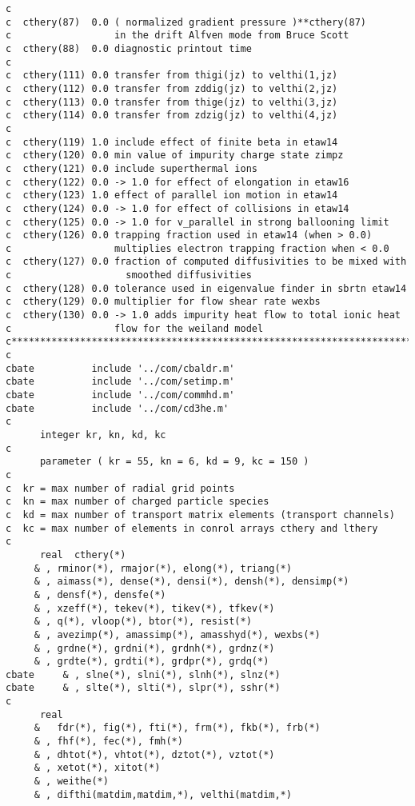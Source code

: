 \begin{verbatim}
c
c  cthery(87)  0.0 ( normalized gradient pressure )**cthery(87)
c                  in the drift Alfven mode from Bruce Scott
c  cthery(88)  0.0 diagnostic printout time
c
c  cthery(111) 0.0 transfer from thigi(jz) to velthi(1,jz)
c  cthery(112) 0.0 transfer from zddig(jz) to velthi(2,jz)
c  cthery(113) 0.0 transfer from thige(jz) to velthi(3,jz)
c  cthery(114) 0.0 transfer from zdzig(jz) to velthi(4,jz)
c
c  cthery(119) 1.0 include effect of finite beta in etaw14
c  cthery(120) 0.0 min value of impurity charge state zimpz
c  cthery(121) 0.0 include superthermal ions
c  cthery(122) 0.0 -> 1.0 for effect of elongation in etaw16
c  cthery(123) 1.0 effect of parallel ion motion in etaw14
c  cthery(124) 0.0 -> 1.0 for effect of collisions in etaw14
c  cthery(125) 0.0 -> 1.0 for v_parallel in strong ballooning limit
c  cthery(126) 0.0 trapping fraction used in etaw14 (when > 0.0)
c                  multiplies electron trapping fraction when < 0.0
c  cthery(127) 0.0 fraction of computed diffusivities to be mixed with
c                    smoothed diffusivities
c  cthery(128) 0.0 tolerance used in eigenvalue finder in sbrtn etaw14
c  cthery(129) 0.0 multiplier for flow shear rate wexbs 
c  cthery(130) 0.0 -> 1.0 adds impurity heat flow to total ionic heat 
c                  flow for the weiland model
c***********************************************************************
c
cbate          include '../com/cbaldr.m'
cbate          include '../com/setimp.m'
cbate          include '../com/commhd.m'
cbate          include '../com/cd3he.m'
c
      integer kr, kn, kd, kc
c
      parameter ( kr = 55, kn = 6, kd = 9, kc = 150 )
c
c  kr = max number of radial grid points
c  kn = max number of charged particle species
c  kd = max number of transport matrix elements (transport channels)
c  kc = max number of elements in conrol arrays cthery and lthery
c
      real  cthery(*)
     & , rminor(*), rmajor(*), elong(*), triang(*)
     & , aimass(*), dense(*), densi(*), densh(*), densimp(*)
     & , densf(*), densfe(*)
     & , xzeff(*), tekev(*), tikev(*), tfkev(*)
     & , q(*), vloop(*), btor(*), resist(*)
     & , avezimp(*), amassimp(*), amasshyd(*), wexbs(*)
     & , grdne(*), grdni(*), grdnh(*), grdnz(*)
     & , grdte(*), grdti(*), grdpr(*), grdq(*)
cbate     & , slne(*), slni(*), slnh(*), slnz(*)
cbate     & , slte(*), slti(*), slpr(*), sshr(*)
c
      real  
     &   fdr(*), fig(*), fti(*), frm(*), fkb(*), frb(*)
     & , fhf(*), fec(*), fmh(*)
     & , dhtot(*), vhtot(*), dztot(*), vztot(*)
     & , xetot(*), xitot(*)
     & , weithe(*)
     & , difthi(matdim,matdim,*), velthi(matdim,*)

\end{verbatim}
